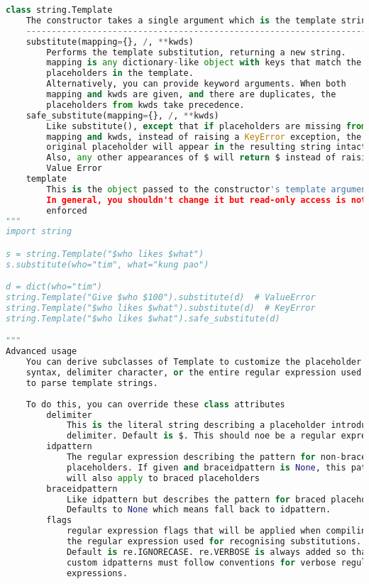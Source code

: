 \documentclass[a4paper,landscape]{report}
\begin{document}
\begin{lstlisting}[language=Python]
class string.Template
    The constructor takes a single argument which is the template string
    ----------------------------------------------------------------------
    substitute(mapping={}, /, **kwds)
        Performs the template substitution, returning a new string. 
        mapping is any dictionary-like object with keys that match the
        placeholders in the template.
        Alternatively, you can provide keyword arguments. When both
        mapping and kwds are given, and there are duplicates, the
        placeholders from kwds take precedence.
    safe_substitute(mapping={}, /, **kwds)
        Like substitute(), except that if placeholders are missing from
        mapping and kwds, instead of raising a KeyError exception, the
        original placeholder will appear in the resulting string intact.
        Also, any other appearances of $ will return $ instead of raising
        Value Error
    template
        This is the object passed to the constructor's template argument.
        In general, you shouldn't change it but read-only access is not
        enforced
"""
import string

s = string.Template("$who likes $what")
s.substitute(who="tim", what="kung pao")

d = dict(who="tim")
string.Template("Give $who $100").substitute(d)  # ValueError
string.Template("$who likes $what").substitute(d)  # KeyError
string.Template("$who likes $what").safe_substitute(d)

"""
Advanced usage
    You can derive subclasses of Template to customize the placeholder
    syntax, delimiter character, or the entire regular expression used
    to parse template strings.
    
    To do this, you can override these class attributes
        delimiter 
            This is the literal string describing a placeholder introducing 
            delimiter. Default is $. This should noe be a regular expression
        idpattern
            The regular expression describing the pattern for non-braced 
            placeholders. If given and braceidpattern is None, this pattern
            will also apply to braced placeholders
        braceidpattern
            Like idpattern but describes the pattern for braced placeholders.
            Defaults to None which means fall back to idpattern.
        flags
            regular expression flags that will be applied when compiling
            the regular expression used for recognising substitutions. 
            Default is re.IGNORECASE. re.VERBOSE is always added so that
            custom idpatterns must follow conventions for verbose regular
            expressions.
            

\end{lstlisting}
\end{document}
